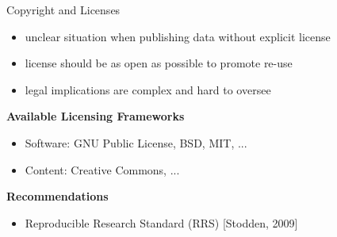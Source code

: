 \documentclass{intbeamer}
\begin{document}
\begin{frame}{Copyright and Licenses}


\begin{itemize}
\item unclear situation when publishing data without explicit license
\item license should be as open as possible to promote re-use
\item legal implications are complex and hard to oversee
\end{itemize}

\vfill

\textbf{Available Licensing Frameworks}
\begin{itemize}
\item Software: GNU Public License, BSD, MIT, ...
\item Content: Creative Commons, ...
\end{itemize}

\textbf{Recommendations}
\begin{itemize}
\item Reproducible Research Standard (RRS) [Stodden, 2009]
\end{itemize}

\end{frame}
\end{document}

